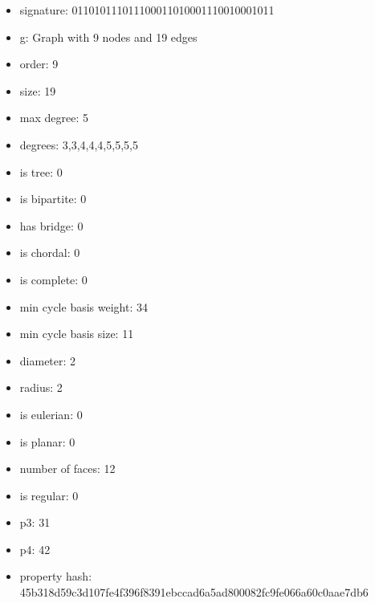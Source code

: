 \newpage
\begin{figure}
\end{figure}
\begin{itemize}
\item signature: 011010111011100011010001110010001011
\item g: Graph with 9 nodes and 19 edges
\item order: 9
\item size: 19
\item max degree: 5
\item degrees: 3,3,4,4,4,5,5,5,5
\item is tree: 0
\item is bipartite: 0
\item has bridge: 0
\item is chordal: 0
\item is complete: 0
\item min cycle basis weight: 34
\item min cycle basis size: 11
\item diameter: 2
\item radius: 2
\item is eulerian: 0
\item is planar: 0
\item number of faces: 12
\item is regular: 0
\item p3: 31
\item p4: 42
\item property hash: 45b318d59c3d107fe4f396f8391ebccad6a5ad800082fc9fe066a60c0aae7db6
\end{itemize}
